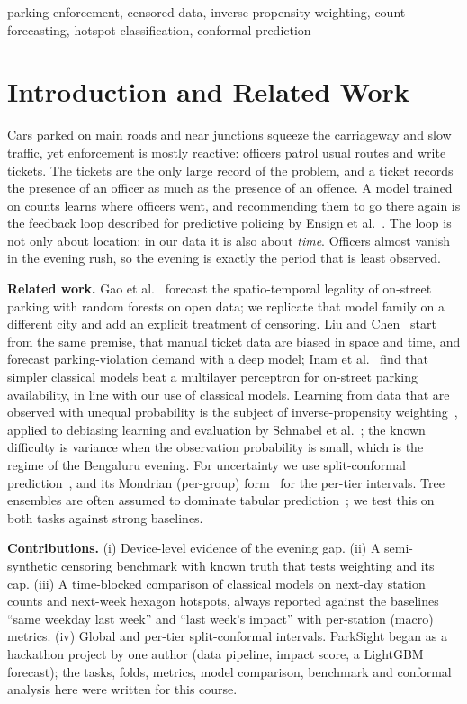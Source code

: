 \documentclass[conference]{IEEEtran}
\begin{document}
\begin{IEEEkeywords}
parking enforcement, censored data, inverse-propensity weighting, count forecasting, hotspot classification, conformal prediction
\end{IEEEkeywords}

\section{Introduction and Related Work}
Cars parked on main roads and near junctions squeeze the carriageway and slow traffic, yet enforcement is mostly reactive: officers patrol usual routes and write tickets. The tickets are the only large record of the problem, and a ticket records the presence of an officer as much as the presence of an offence. A model trained on counts learns where officers went, and recommending them to go there again is the feedback loop described for predictive policing by Ensign et al.~\cite{ensign2018runaway}. The loop is not only about location: in our data it is also about \emph{time}. Officers almost vanish in the evening rush, so the evening is exactly the period that is least observed.

\textbf{Related work.} Gao et al.~\cite{gao2019parking} forecast the spatio-temporal legality of on-street parking with random forests on open data; we replicate that model family on a different city and add an explicit treatment of censoring. Liu and Chen~\cite{liu2025parking} start from the same premise, that manual ticket data are biased in space and time, and forecast parking-violation demand with a deep model; Inam et al.~\cite{inam2022multisource} find that simpler classical models beat a multilayer perceptron for on-street parking availability, in line with our use of classical models. Learning from data that are observed with unequal probability is the subject of inverse-propensity weighting~\cite{horvitz1952generalization}, applied to debiasing learning and evaluation by Schnabel et al.~\cite{schnabel2016recommendations}; the known difficulty is variance when the observation probability is small, which is the regime of the Bengaluru evening. For uncertainty we use split-conformal prediction~\cite{lei2018distribution}, and its Mondrian (per-group) form~\cite{vovk2005algorithmic} for the per-tier intervals. Tree ensembles are often assumed to dominate tabular prediction~\cite{grinsztajn2022tree}; we test this on both tasks against strong baselines.

\textbf{Contributions.} (i) Device-level evidence of the evening gap. (ii) A semi-synthetic censoring benchmark with known truth that tests weighting and its cap. (iii) A time-blocked comparison of classical models on next-day station counts and next-week hexagon hotspots, always reported against the baselines ``same weekday last week'' and ``last week's impact'' with per-station (macro) metrics. (iv) Global and per-tier split-conformal intervals. ParkSight began as a hackathon project by one author (data pipeline, impact score, a LightGBM forecast); the tasks, folds, metrics, model comparison, benchmark and conformal analysis here were written for this course.
\end{document}
